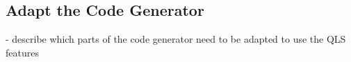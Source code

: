 \subsection{Adapt the Code Generator}

- describe which parts of the code generator need to be adapted to use the QLS features
